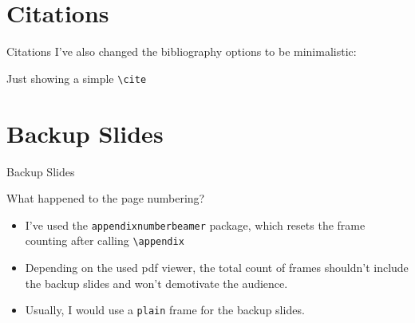 \documentclass[aspectratio=169]{beamer}
\begin{document}
\section{Citations}
\begin{frame}{Citations}
	I've also changed the bibliography options to be minimalistic:

	Just showing a simple \texttt{\textbackslash{}cite} \cite{AlexNet}
	\vfill
	\printbibliography
\end{frame}

\appendix %
\section*{Backup Slides}
\begin{frame}
	\centering
	\vfill
	{\fontsize{40}{50}\selectfont Backup Slides}
	\vfill
\end{frame}

\begin{frame}{What happened to the page numbering?}
	\begin{itemize}
		\item I've used the \texttt{appendixnumberbeamer}
		      package, which resets the frame counting after calling
		      \texttt{\textbackslash{}appendix}
		\item Depending on the used pdf viewer, the total
		      count of frames shouldn't include the backup slides and
		      won't demotivate the audience.
		\item Usually, I would use a \texttt{plain} frame
		      for the backup slides.
	\end{itemize}
\end{frame}
\end{document}
